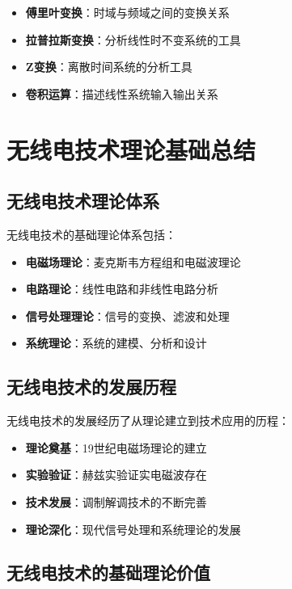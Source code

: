 \documentclass[12pt,UTF8]{ctexbook}
\begin{document}
\begin{itemize}[leftmargin=3.5em]
    \item \textbf{傅里叶变换}：时域与频域之间的变换关系
    \item \textbf{拉普拉斯变换}：分析线性时不变系统的工具
    \item \textbf{Z变换}：离散时间系统的分析工具
    \item \textbf{卷积运算}：描述线性系统输入输出关系
\end{itemize}

\chapter{无线电技术理论基础总结}

\section{无线电技术理论体系}

无线电技术的基础理论体系包括：

\begin{itemize}[leftmargin=3.5em]
    \item \textbf{电磁场理论}：麦克斯韦方程组和电磁波理论
    \item \textbf{电路理论}：线性电路和非线性电路分析
    \item \textbf{信号处理理论}：信号的变换、滤波和处理
    \item \textbf{系统理论}：系统的建模、分析和设计
\end{itemize}

\section{无线电技术的发展历程}

无线电技术的发展经历了从理论建立到技术应用的历程：

\begin{itemize}[leftmargin=3.5em]
    \item \textbf{理论奠基}：19世纪电磁场理论的建立
    \item \textbf{实验验证}：赫兹实验证实电磁波存在
    \item \textbf{技术发展}：调制解调技术的不断完善
    \item \textbf{理论深化}：现代信号处理和系统理论的发展
\end{itemize}
\section{无线电技术的基础理论价值}
\end{document}
